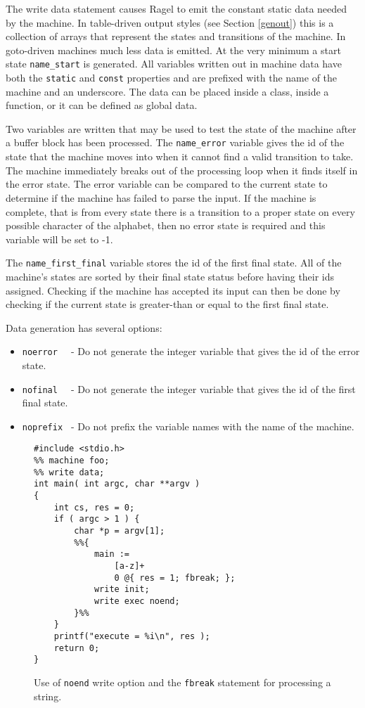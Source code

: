 \documentclass[letterpaper,11pt,oneside]{book}
\begin{document}
The write data statement causes Ragel to emit the constant static data needed
by the machine. In table-driven output styles (see Section \ref{genout}) this
is a collection of arrays that represent the states and transitions of the
machine.  In goto-driven machines much less data is emitted. At the very
minimum a start state \verb|name_start| is generated.  All variables written
out in machine data have both the \verb|static| and \verb|const| properties and
are prefixed with the name of the machine and an
underscore. The data can be placed inside a class, inside a function, or it can
be defined as global data.

Two variables are written that may be used to test the state of the machine
after a buffer block has been processed. The \verb|name_error| variable gives
the id of the state that the machine moves into when it cannot find a valid
transition to take. The machine immediately breaks out of the processing loop when
it finds itself in the error state. The error variable can be compared to the
current state to determine if the machine has failed to parse the input. If the
machine is complete, that is from every state there is a transition to a proper
state on every possible character of the alphabet, then no error state is required
and this variable will be set to -1.

The \verb|name_first_final| variable stores the id of the first final state. All of the
machine's states are sorted by their final state status before having their ids
assigned. Checking if the machine has accepted its input can then be done by
checking if the current state is greater-than or equal to the first final
state.

Data generation has several options:

\begin{itemize}
\setlength{\itemsep}{-2mm}
\item \verb|noerror  | - Do not generate the integer variable that gives the
id of the error state.
\item \verb|nofinal  | - Do not generate the integer variable that gives the
id of the first final state.
\item \verb|noprefix | - Do not prefix the variable names with the name of the
machine.
\end{itemize}

\begin{figure}
\small
\begin{verbatim}
#include <stdio.h>
%% machine foo;
%% write data;
int main( int argc, char **argv )
{
    int cs, res = 0;
    if ( argc > 1 ) {
        char *p = argv[1];
        %%{ 
            main := 
                [a-z]+ 
                0 @{ res = 1; fbreak; };
            write init;
            write exec noend;
        }%%
    }
    printf("execute = %i\n", res );
    return 0;
}
\end{verbatim}
\caption{Use of {\tt noend} write option and the {\tt fbreak} statement for
processing a string.
}
\label{fbreak-example}
\end{figure}
\end{document}
